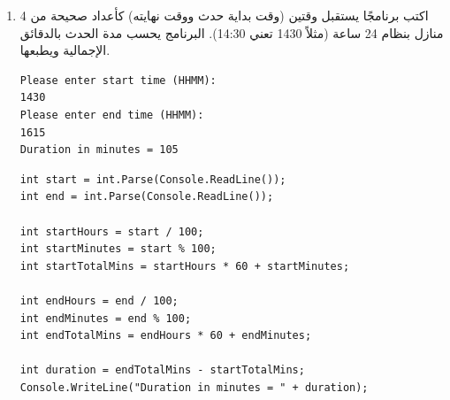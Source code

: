 \documentclass[14pt]{extarticle}
\begin{document}
\begin{enumerate}[itemsep=3em]
\begin{boxSolution}
\begin{english}
\begin{verbatim}
int bills200 = amount / 200;
amount = amount % 200;

int bills100 = amount / 100;
amount = amount % 100;

int bills50 = amount / 50;
amount = amount % 50;

Console.WriteLine("200 bills: " + bills200);
Console.WriteLine("100 bills: " + bills100);
Console.WriteLine("50 bills: " + bills50);
    \end{verbatim}
    \end{english}
    \end{boxSolution}
    \fi
    \fi
    \clearpage

    \item
    اكتب برنامجًا يستقبل وقتين (وقت بداية حدث ووقت نهايته) كأعداد صحيحة من 4 منازل بنظام 24 ساعة (مثلاً 1430 تعني 14:30).
    البرنامج يحسب مدة الحدث بالدقائق الإجمالية ويطبعها.
    \ifdetailed
    \begin{boxExample}
    \begin{english}
    \begin{verbatim}
Please enter start time (HHMM):
1430
Please enter end time (HHMM):
1615
Duration in minutes = 105
    \end{verbatim}
    \end{english}
    \end{boxExample}
    \ifwithsols
    \begin{boxSolution}
    \begin{english}
    \begin{verbatim}
int start = int.Parse(Console.ReadLine());
int end = int.Parse(Console.ReadLine());

int startHours = start / 100;
int startMinutes = start % 100;
int startTotalMins = startHours * 60 + startMinutes;

int endHours = end / 100;
int endMinutes = end % 100;
int endTotalMins = endHours * 60 + endMinutes;

int duration = endTotalMins - startTotalMins;
Console.WriteLine("Duration in minutes = " + duration);
    \end{verbatim}
    \end{english}
    \end{boxSolution}
    \clearpage
    \fi
    \fi
    \ifwhiteblack
    \clearpage
    \fi


\end{enumerate}
\end{document}
